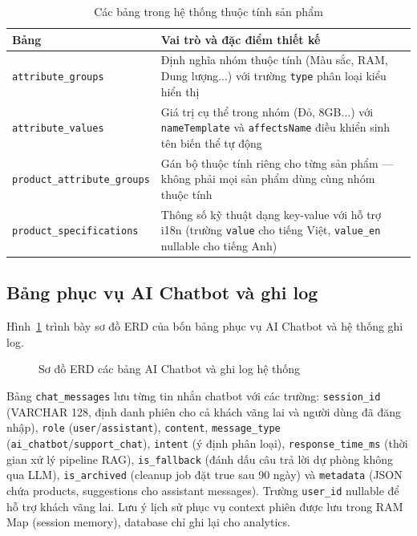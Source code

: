 \begin{table}[H]
  \centering
  \caption{Các bảng trong hệ thống thuộc tính sản phẩm}
  \label{tab:attribute_tables}
  \begin{tabular}{|l|p{9cm}|}
    \hline
    \textbf{Bảng} & \textbf{Vai trò và đặc điểm thiết kế} \\
    \hline
    \texttt{attribute\_groups} & Định nghĩa nhóm thuộc tính (Màu sắc, RAM, Dung lượng...) với trường \texttt{type} phân loại kiểu hiển thị \\
    \hline
    \texttt{attribute\_values} & Giá trị cụ thể trong nhóm (Đỏ, 8GB...) với \texttt{nameTemplate} và \texttt{affectsName} điều khiển sinh tên biến thể tự động \\
    \hline
    \texttt{product\_attribute\_groups} & Gán bộ thuộc tính riêng cho từng sản phẩm — không phải mọi sản phẩm dùng cùng nhóm thuộc tính \\
    \hline
    \texttt{product\_specifications} & Thông số kỹ thuật dạng key-value với hỗ trợ i18n (trường \texttt{value} cho tiếng Việt, \texttt{value\_en} nullable cho tiếng Anh) \\
    \hline
  \end{tabular}
\end{table}

\subsection{Bảng phục vụ AI Chatbot và ghi log}

Hình~\ref{fig:erd_ai_log} trình bày sơ đồ ERD của bốn bảng phục vụ AI Chatbot và hệ thống ghi log.

\begin{figure}[H]
  \centering
  \caption{Sơ đồ ERD các bảng AI Chatbot và ghi log hệ thống}
  \label{fig:erd_ai_log}
\end{figure}

Bảng \texttt{chat\_messages} lưu từng tin nhắn chatbot với các trường: \texttt{session\_id} (VARCHAR 128, định danh phiên cho cả khách vãng lai và người dùng đã đăng nhập), \texttt{role} (\texttt{user}\slash\texttt{assistant}), \texttt{content}, \texttt{message\_type} (\texttt{ai\_chatbot}\slash\texttt{support\_chat}), \texttt{intent} (ý định phân loại), \texttt{response\_time\_ms} (thời gian xử lý pipeline RAG), \texttt{is\_fallback} (đánh dấu câu trả lời dự phòng không qua LLM), \texttt{is\_archived} (cleanup job đặt true sau 90 ngày) và \texttt{metadata} (JSON chứa products, suggestions cho assistant messages). Trường \texttt{user\_id} nullable để hỗ trợ khách vãng lai. Lưu ý lịch sử phục vụ context phiên được lưu trong RAM Map (session memory), database chỉ ghi lại cho analytics.

